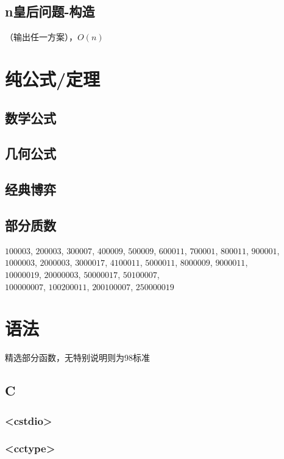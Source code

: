 \documentclass[10pt]{article}
\begin{document}
\subsection{n皇后问题-构造}
（输出任一方案），$O(n)$

\section{纯公式/定理}
\subsection{数学公式}


\subsection{几何公式}


\subsection{经典博弈}


\subsection{部分质数}
\noindent
$100003$, $200003$, $300007$, $400009$, $500009$, $600011$, $700001$, $800011$, $900001$, \\
$1000003$, $2000003$, $3000017$, $4100011$, $5000011$, $8000009$, $9000011$, \\
$10000019$, $20000003$, $50000017$, $50100007$, \\
$100000007$, $100200011$, $200100007$, $250000019$
\section{语法}
精选部分函数，无特别说明则为98标准
\subsection{C}
\subsubsection{<cstdio>}

\subsubsection{<cctype>}

\end{document}
